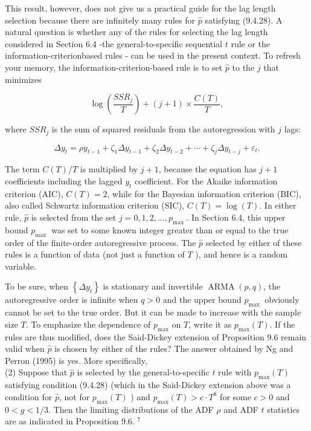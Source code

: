 \documentclass[10pt]{article}
\begin{document}
This result, however, does not give us a practical guide for the lag length selection because there are infinitely many rules for $\hat{p}$ satisfying (9.4.28). A natural question is whether any of the rules for selecting the lag length considered in Section 6.4 -the general-to-specific sequential $t$ rule or the information-criterionbased rules - can be used in the present context. To refresh your memory, the information-criterion-based rule is to set $\hat{p}$ to the $j$ that minimizes


\begin{equation*}
\log \left(\frac{S S R_{j}}{T}\right)+(j+1) \times \frac{C(T)}{T}, \tag{9.4.29}
\end{equation*}


where $S S R_{j}$ is the sum of squared residuals from the autoregression with $j$ lags:


\begin{equation*}
\Delta y_{t}=\rho y_{t-1}+\zeta_{1} \Delta y_{t-1}+\zeta_{2} \Delta y_{t-2}+\cdots+\zeta_{j} \Delta y_{t-j}+\varepsilon_{t} . \tag{9.4.30}
\end{equation*}


The term $C(T) / T$ is multiplied by $j+1$, because the equation has $j+1$ coefficients including the lagged $y_{t}$ coefficient. For the Akaike information criterion (AIC), $C(T)=2$, while for the Bayesian information criterion (BIC), also called Schwartz information criterion (SIC), $C(T)=\log (T)$. In either rule, $\hat{p}$ is selected from the set $j=0,1,2, \ldots, p_{\text {max }}$. In Section 6.4, this upper bound $p_{\text {max }}$ was set to some known integer greater than or equal to the true order of the finite-order autoregressive process. The $\hat{p}$ selected by either of these rules is a function of data (not just a function of $T$ ), and hence is a random variable.

To be sure, when $\left\{\Delta y_{t}\right\}$ is stationary and invertible $\operatorname{ARMA}(p, q)$, the autoregressive order is infinite when $q>0$ and the upper bound $p_{\text {max }}$ obviously cannot be set to the true order. But it can be made to increase with the sample size $T$. To emphasize the dependence of $p_{\max }$ on $T$, write it as $p_{\max }(T)$. If the rules are thus modified, does the Said-Dickey extension of Proposition 9.6 remain valid when $\hat{p}$ is chosen by either of the rules? The answer obtained by Ng and Perron (1995) is yes. More specifically,\\
(2) Suppose that $\hat{p}$ is selected by the general-to-specific $t$ rule with $p_{\max }(T)$ satisfying condition (9.4.28) (which in the Said-Dickey extension above was a condition for $\hat{p}$, not for $p_{\max }(T)$ ) and $p_{\max }(T)>c \cdot T^{8}$ for some $c>0$ and $0<g<1 / 3$. Then the limiting distributions of the ADF $\rho$ and ADF $t$ statistics are as indicated in Proposition 9.6. ${ }^{7}$
\end{document}
